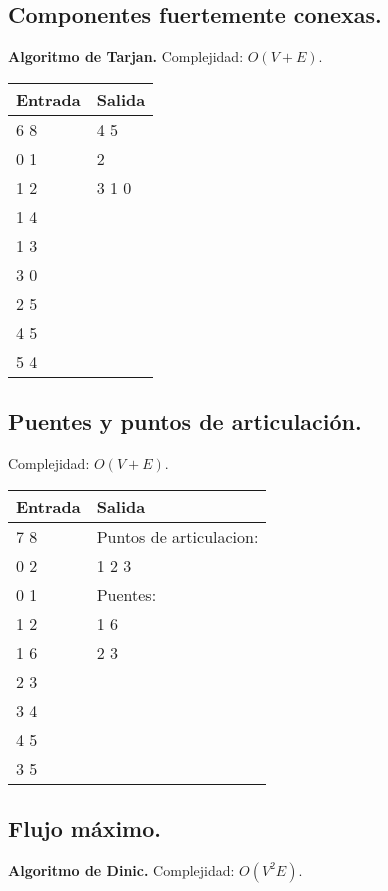 \documentclass[10pt, letterpaper, twoside]{article}
\begin{document}
\subsection{Componentes fuertemente conexas.}

\textbf{Algoritmo de Tarjan.} Complejidad: $O(V + E)$.



\begin{tabular}{|p{7cm}|p{7cm}|}
\hline
\textbf{Entrada} & \textbf{Salida} \\ \hline
6 8 & 4 5 \\
0 1 & 2 \\
1 2 & 3 1 0 \\
1 4 & \\ 
1 3 & \\
3 0 & \\
2 5 & \\
4 5 & \\
5 4 & \\ \hline
\end{tabular}

\subsection{Puentes y puntos de articulación.}

Complejidad: $O(V + E)$.



\begin{tabular}{|p{7cm}|p{7cm}|}
\hline
\textbf{Entrada} & \textbf{Salida} \\ \hline
7 8 & Puntos de articulacion: \\
0 2 & 1 2 3 \\
0 1 & Puentes: \\
1 2 & 1 6 \\ 
1 6 & 2 3 \\
2 3 & \\
3 4 & \\
4 5 & \\
3 5 & \\ \hline
\end{tabular}

\subsection{Flujo máximo.}

\textbf{Algoritmo de Dinic.} Complejidad: $O(V^2 E)$.
\end{document}

